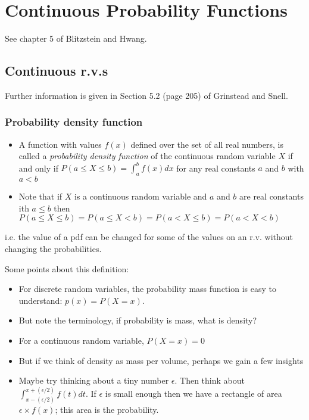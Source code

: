 \documentclass[12pt]{extbook}
\begin{document}
\chapter{Continuous Probability Functions}

See chapter 5 of Blitzstein and Hwang.



\section{Continuous r.v.s}

Further information is given in Section 5.2 (page 205) of Grinstead and Snell.

\subsection{Probability density function}

\begin{itemize}
\item A function with values $f(x)$ defined over the set of all real numbers, is called a \emph{probability density function} of the continuous random variable $X$ if and only if $P(a \leq X \leq b) = \int_{a}^{b} f(x) dx$ for any real constants $a$ and $b$ with $a < b$
\item Note that if $X$ is a continuous random variable and $a$ and $b$ are real constants ith $a \leq b$ then $P(a \leq X \leq b) = P(a \leq X < b) = P(a < X \leq b) = P(a < X < b)$
\end{itemize}
i.e. the value of a pdf can be changed for some of the values on an r.v. without changing the probabilities.


Some points about this definition:
\begin{itemize}
\item For discrete random variables, the probability mass function is easy to understand: $p(x) = P(X=x)$.
\item But note the terminology, if probability is mass, what is density?
\item For a continuous random variable, $P(X=x)=0$
\item But if we think of density as mass per volume, perhaps we gain a few insights
\item Maybe try thinking about a tiny number $\epsilon$.  Then think about $\int_{x-(\epsilon/2)}^{x+(\epsilon/2)} f(t)dt$.   If $\epsilon$ is small enough then we have a rectangle of area $\epsilon \times f(x)$; this area is the probability.
\end{itemize}
\end{document}
